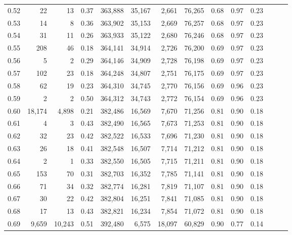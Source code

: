 \begin{tabular}{rrrrrrrrrrrrrr}
0.52 &      22 &      13 &  0.37 &  363,888 &   35,167 &   2,661 &  76,265 &  0.68 &  0.97 &      0.23 \\
0.53 &      14 &       8 &  0.36 &  363,902 &   35,153 &   2,669 &  76,257 &  0.68 &  0.97 &      0.23 \\
0.54 &      31 &      11 &  0.26 &  363,933 &   35,122 &   2,680 &  76,246 &  0.68 &  0.97 &      0.23 \\
0.55 &     208 &      46 &  0.18 &  364,141 &   34,914 &   2,726 &  76,200 &  0.69 &  0.97 &      0.23 \\
0.56 &       5 &       2 &  0.29 &  364,146 &   34,909 &   2,728 &  76,198 &  0.69 &  0.97 &      0.23 \\
0.57 &     102 &      23 &  0.18 &  364,248 &   34,807 &   2,751 &  76,175 &  0.69 &  0.97 &      0.23 \\
0.58 &      62 &      19 &  0.23 &  364,310 &   34,745 &   2,770 &  76,156 &  0.69 &  0.96 &      0.23 \\
0.59 &       2 &       2 &  0.50 &  364,312 &   34,743 &   2,772 &  76,154 &  0.69 &  0.96 &      0.23 \\
0.60 &  18,174 &   4,898 &  0.21 &  382,486 &   16,569 &   7,670 &  71,256 &  0.81 &  0.90 &      0.18 \\
0.61 &       4 &       3 &  0.43 &  382,490 &   16,565 &   7,673 &  71,253 &  0.81 &  0.90 &      0.18 \\
0.62 &      32 &      23 &  0.42 &  382,522 &   16,533 &   7,696 &  71,230 &  0.81 &  0.90 &      0.18 \\
0.63 &      26 &      18 &  0.41 &  382,548 &   16,507 &   7,714 &  71,212 &  0.81 &  0.90 &      0.18 \\
0.64 &       2 &       1 &  0.33 &  382,550 &   16,505 &   7,715 &  71,211 &  0.81 &  0.90 &      0.18 \\
0.65 &     153 &      70 &  0.31 &  382,703 &   16,352 &   7,785 &  71,141 &  0.81 &  0.90 &      0.18 \\
0.66 &      71 &      34 &  0.32 &  382,774 &   16,281 &   7,819 &  71,107 &  0.81 &  0.90 &      0.18 \\
0.67 &      30 &      22 &  0.42 &  382,804 &   16,251 &   7,841 &  71,085 &  0.81 &  0.90 &      0.18 \\
0.68 &      17 &      13 &  0.43 &  382,821 &   16,234 &   7,854 &  71,072 &  0.81 &  0.90 &      0.18 \\
0.69 &   9,659 &  10,243 &  0.51 &  392,480 &    6,575 &  18,097 &  60,829 &  0.90 &  0.77 &      0.14 \\

\end{tabular}
